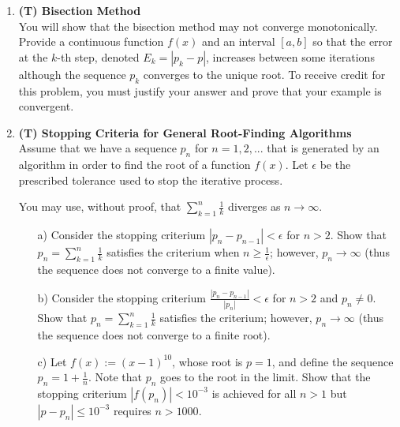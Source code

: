 \documentclass[12pt]{article}
\begin{document}
\begin{enumerate}[label=\bfseries Problem \arabic*:]
 \vspace{1em}
\item \textbf{(T) Bisection Method}\\
You will show that the bisection method may not converge monotonically. Provide a continuous function $f(x)$ and an interval $[a,b]$ so that the error at the $k$-th step, denoted $E_{k}=|p_k-p|$, increases between some iterations although the sequence $p_k$ converges to the unique root. To receive credit for this problem, you must justify your answer and prove that your example is convergent.

 
 
 
\item \textbf{(T) Stopping Criteria for General Root-Finding Algorithms}\\
Assume that we have a sequence $p_n$ for $n=1,2,...$ that is generated by an algorithm in order to find the root of a function $f(x)$. Let $\epsilon$ be the prescribed tolerance used to stop the iterative process. 

You may use, without proof, that  $\sum_{k=1}^n \frac{1}{k}$ diverges as $n\rightarrow \infty$.



\begin{itemize}
\item[a)] Consider the stopping criterium $|p_{n}-p_{n-1}|< \epsilon$ for $n>2$. Show that $p_n=\sum_{k=1}^n \frac{1}{k}$ satisfies the criterium when $n\geq\frac{1}{\epsilon}$; however, $p_n \rightarrow \infty$  (thus the sequence does not converge to a finite value).


\item[b)] Consider the stopping criterium $\frac{|p_{n}-p_{n-1}|}{|p_n|}< \epsilon$ for $n>2$ and $p_n\neq 0$. Show that $p_n=\sum_{k=1}^n \frac{1}{k}$ satisfies the criterium; however, $p_n \rightarrow \infty$ (thus the sequence does not converge to a finite root).

 
 \item[c)] Let  $f(x):=(x-1)^{10}$, whose root is $p=1$, and define the sequence $p_n=1+\frac{1}{n}$. Note that $p_n$ goes to the root in the limit. Show that the stopping criterium $|f(p_n)| < 10^{-3}$ is achieved for all $n>1$ but $|p-p_n|\leq 10^{-3}$ requires $n>1000$.
 

 
 
 
\end{itemize}



\end{enumerate}
\end{document}
